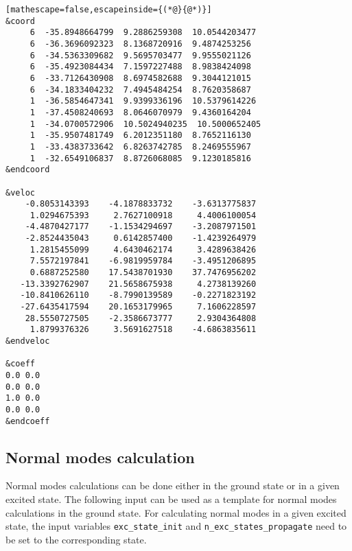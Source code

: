 \begin{lstlisting}[mathescape=false,escapeinside={(*@}{@*)}]
&coord
     6  -35.8948664799  9.2886259308  10.0544203477
     6  -36.3696092323  8.1368720916  9.4874253256
     6  -34.5363309682  9.5695703477  9.9555021126
     6  -35.4923084434  7.1597227488  8.9838424098
     6  -33.7126430908  8.6974582688  9.3044121015
     6  -34.1833404232  7.4945484254  8.7620358687
     1  -36.5854647341  9.9399336196  10.5379614226
     1  -37.4508240693  8.0646070979  9.4360164204
     1  -34.0700572906  10.5024940235  10.5000652405
     1  -35.9507481749  6.2012351180  8.7652116130
     1  -33.4383733642  6.8263742785  8.2469555967
     1  -32.6549106837  8.8726068085  9.1230185816
&endcoord

&veloc
    -0.8053143393    -4.1878833732    -3.6313775837
     1.0294675393     2.7627100918     4.4006100054
    -4.4870427177    -1.1534294697    -3.2087971501
    -2.8524435043     0.6142857400    -1.4239264979
     1.2815455099     4.6430462174     3.4289638426
     7.5572197841    -6.9819959784    -3.4951206895
     0.6887252580    17.5438701930    37.7476956202
   -13.3392762907    21.5658675938     4.2738139260
   -10.8410626110    -8.7990139589    -0.2271823192
   -27.6435417594    20.1653179965     7.1606228597
    28.5550727505    -2.3586673777     2.9304364808
     1.8799376326     3.5691627518    -4.6863835611
&endveloc

&coeff
0.0 0.0
0.0 0.0
1.0 0.0
0.0 0.0
&endcoeff
\end{lstlisting}

\subsection{Normal modes calculation}

Normal modes calculations can be done either in the ground state or in a given excited state. The following input can be used as a template for normal modes calculations in the ground state. For calculating normal modes in a given excited state, the input variables \verb+exc_state_init+ and \verb+n_exc_states_propagate+ need to be set to the corresponding state.

